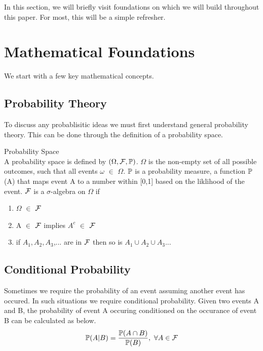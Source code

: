 In this section, we will briefly visit foundations on which we will build throughout this paper. For most, this will be a simple refresher. 

\section{Mathematical Foundations}
We start with a few key mathematical concepts.
\subsection{Probability Theory}
To discuss any probablisitic ideas we must first understand general probability theory. This can be done through the definition of a probability space.
\begin{definition}
	\label{probtheory}
	Probability Space \\
	A probability space is defined by $(\Omega ,\mathcal{F} , \mathbb{P})$. $\Omega$ is the non-empty set of 		all possible outcomes, such that all events $\omega$ $\in$ $\Omega$. $\mathbb{P}$ is a probability				measure, a function $\mathbb{P}$(A) that maps event A to a number within [0,1] based on the liklihood of 		the event. $\mathcal{F}$ is a $\sigma$-algebra on $\Omega$ if

	\begin{enumerate}
		\item $\Omega$ $\in$ $\mathcal{F}$
		\item A $\in$ $\mathcal{F}$ implies $A^c$ $\in$ $\mathcal{F}$
		\item if $A_1, A_2, A_3$,... are in $\mathcal{F}$ then so is $A_1 \cup A_2 \cup A_3$...
	\end{enumerate}
\end{definition}

\subsection{Conditional Probability}
Sometimes we require the probability of an event assuming another event has occured. In such situations we require conditional probability. Given two events A and B, the probability of event A occuring conditioned on the occurance of event B can be calculated as below. \\ 
\begin{equation}
\label{condprob}
	\mathbb{P} (A|B) = \dfrac{\mathbb{P} (A \cap B)}{\mathbb{P} (B)}, \  \forall A \in \mathcal{F}
\end{equation}
\\


